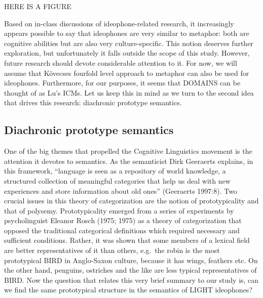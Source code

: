 \documentclass[12pt,article,oneside]{memoir}
\theoremstyle{definition}
\theoremstyle{definition}
\theoremstyle{definition}
\theoremstyle{remark}
\begin{document}
HERE IS A FIGURE

Based on in-class discussions of ideophone-related research, it
increasingly appears possible to say that ideophones are very similar to
metaphor: both are cognitive abilities but are also very
culture-specific. This notion deserves further exploration, but
unfortunately it falls outside the scope of this study. However, future
research should devote considerable attention to it. For now, we will
assume that Kövecses fourfold level approach to metaphor can also be
used for ideophones. Furthermore, for our purposes, it seems that
DOMAINS can be thought of as Lu's ICMs. Let us keep this in mind as we
turn to the second idea that drives this research: diachronic prototype
semantics.

\subsection{Diachronic prototype
semantics}\label{diachronic-prototype-semantics}

One of the big themes that propelled the Cognitive Linguistics movement
is the attention it devotes to semantics. As the semanticist Dirk
Geeraerts explains, in this framework, ``language is seen as a
repository of world knowledge, a structured collection of meaningful
categories that help us deal with new experiences and store information
about old ones'' (Geeraerts 1997:8). Two crucial issues in this theory
of categorization are the notion of prototypicality and that of
polysemy. Prototypicality emerged from a series of experiments by
psycholinguist Eleanor Rosch (1975; 1975) as a theory of categorization
that opposed the traditional categorical definitions which required
necessary and sufficient conditions. Rather, it was shown that some
members of a lexical field are better representatives of it than others,
e.g.~the robin is the most prototypical BIRD in Anglo-Saxon culture,
because it has wings, feathers etc. On the other hand, penguins,
ostriches and the like are less typical representatives of BIRD. Now the
question that relates this very brief summary to our study is, can we
find the same prototypical structure in the semantics of LIGHT
ideophones?
\end{document}
